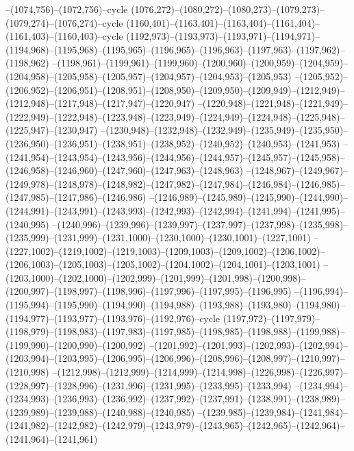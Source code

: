 --(1074,756)--(1072,756)--cycle
(1076,272)--(1080,272)--(1080,273)--(1079,273)--(1079,274)--(1076,274)--cycle
(1160,401)--(1163,401)--(1163,404)--(1161,404)--(1161,403)--(1160,403)--cycle
(1192,973)--(1193,973)--(1193,971)--(1194,971)--(1194,968)--(1195,968)--(1195,965)--(1196,965)--(1196,963)--(1197,963)--(1197,962)--(1198,962)
--(1198,961)--(1199,961)--(1199,960)--(1200,960)--(1200,959)--(1204,959)--(1204,958)--(1205,958)--(1205,957)--(1204,957)--(1204,953)--(1205,953)
--(1205,952)--(1206,952)--(1206,951)--(1208,951)--(1208,950)--(1209,950)--(1209,949)--(1212,949)--(1212,948)--(1217,948)--(1217,947)--(1220,947)
--(1220,948)--(1221,948)--(1221,949)--(1222,949)--(1222,948)--(1223,948)--(1223,949)--(1224,949)--(1224,948)--(1225,948)--(1225,947)--(1230,947)
--(1230,948)--(1232,948)--(1232,949)--(1235,949)--(1235,950)--(1236,950)--(1236,951)--(1238,951)--(1238,952)--(1240,952)--(1240,953)--(1241,953)
--(1241,954)--(1243,954)--(1243,956)--(1244,956)--(1244,957)--(1245,957)--(1245,958)--(1246,958)--(1246,960)--(1247,960)--(1247,963)--(1248,963)
--(1248,967)--(1249,967)--(1249,978)--(1248,978)--(1248,982)--(1247,982)--(1247,984)--(1246,984)--(1246,985)--(1247,985)--(1247,986)--(1246,986)
--(1246,989)--(1245,989)--(1245,990)--(1244,990)--(1244,991)--(1243,991)--(1243,993)--(1242,993)--(1242,994)--(1241,994)--(1241,995)--(1240,995)
--(1240,996)--(1239,996)--(1239,997)--(1237,997)--(1237,998)--(1235,998)--(1235,999)--(1231,999)--(1231,1000)--(1230,1000)--(1230,1001)--(1227,1001)
--(1227,1002)--(1219,1002)--(1219,1003)--(1209,1003)--(1209,1002)--(1206,1002)--(1206,1003)--(1205,1003)--(1205,1002)--(1204,1002)--(1204,1001)--(1203,1001)
--(1203,1000)--(1202,1000)--(1202,999)--(1201,999)--(1201,998)--(1200,998)--(1200,997)--(1198,997)--(1198,996)--(1197,996)--(1197,995)--(1196,995)
--(1196,994)--(1195,994)--(1195,990)--(1194,990)--(1194,988)--(1193,988)--(1193,980)--(1194,980)--(1194,977)--(1193,977)--(1193,976)--(1192,976)--cycle
(1197,972)--(1197,979)--(1198,979)--(1198,983)--(1197,983)--(1197,985)--(1198,985)--(1198,988)--(1199,988)--(1199,990)--(1200,990)--(1200,992)
--(1201,992)--(1201,993)--(1202,993)--(1202,994)--(1203,994)--(1203,995)--(1206,995)--(1206,996)--(1208,996)--(1208,997)--(1210,997)--(1210,998)
--(1212,998)--(1212,999)--(1214,999)--(1214,998)--(1226,998)--(1226,997)--(1228,997)--(1228,996)--(1231,996)--(1231,995)--(1233,995)--(1233,994)
--(1234,994)--(1234,993)--(1236,993)--(1236,992)--(1237,992)--(1237,991)--(1238,991)--(1238,989)--(1239,989)--(1239,988)--(1240,988)--(1240,985)
--(1239,985)--(1239,984)--(1241,984)--(1241,982)--(1242,982)--(1242,979)--(1243,979)--(1243,965)--(1242,965)--(1242,964)--(1241,964)--(1241,961)
